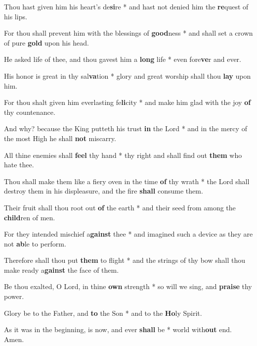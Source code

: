\begin{multicols}{8}
	Thou hast given him his heart's de\textbf{si}re * and hast not denied him the \textbf{re}quest of his lips.
	
	For thou shall prevent him with the blessings of \textbf{good}ness * and shall set a crown of pure \textbf{gold} upon his head.
	
	He asked life of thee, and thou gavest him a \textbf{long} life * even fore\textbf{ve}r and ever.
	
	His honor is great in thy sal\textbf{va}tion * glory and great worship shall thou \textbf{lay} upon him.
	
	For thou shalt given him everlasting fe\textbf{li}city * and make him glad with the joy \textbf{of} thy countenance.
	
	And why? because the King putteth his trust \textbf{in} the Lord * and in the mercy of the most High he shall \textbf{not} miscarry.
	
	All thine enemies shall \textbf{feel} thy hand * thy right and shall find out \textbf{them} who hate thee.
	
	Thou shall make them like a fiery oven in the time \textbf{of} thy wrath * the Lord shall destroy them in his displeasure, and the fire \textbf{shall} consume them.
	
	Their fruit shall thou root out \textbf{of} the earth * and their seed from among the \textbf{child}ren of men.
	
	For they intended mischief a\textbf{gainst} thee * and imagined such a device as they are not \textbf{ab}le to perform.
	
	Therefore shall thou put \textbf{them} to flight * and the strings of thy bow shall thou make ready a\textbf{gainst} the face of them.
	
	Be thou exalted, O Lord, in thine \textbf{own} strength * so will we sing, and \textbf{praise} thy power.
	
	Glory be to the Father, and \textbf{to} the Son * and to the \textbf{Ho}ly Spirit.
	
	As it was in the beginning, is now, and ever \textbf{shall} be * world with\textbf{out} end. Amen.
\end{multicols}
